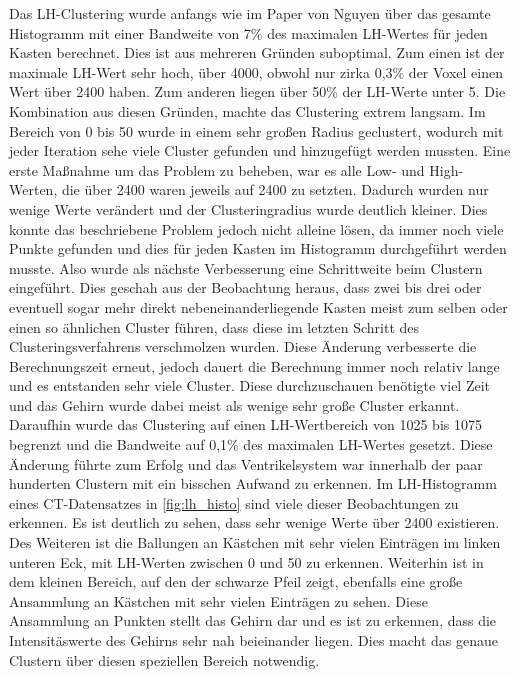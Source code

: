 Das LH-Clustering wurde anfangs wie im Paper von Nguyen \cite{nguyen2012clustering} über das gesamte Histogramm mit einer Bandweite von 7\% des maximalen LH-Wertes für jeden Kasten berechnet. Dies ist aus mehreren Gründen suboptimal.
Zum einen ist der maximale LH-Wert sehr hoch, über 4000, obwohl nur zirka 0,3\% der Voxel einen Wert über 2400 haben. Zum anderen liegen über 50\% der LH-Werte unter 5. Die Kombination aus diesen Gründen, machte das Clustering extrem langsam. Im Bereich von 0 bis 50  wurde in einem sehr großen Radius geclustert, wodurch mit jeder Iteration sehe viele Cluster gefunden und hinzugefügt werden mussten.
\newline
Eine erste Maßnahme um das Problem zu beheben, war es alle Low- und High- Werten, die über 2400 waren jeweils auf 2400 zu setzten. Dadurch wurden nur wenige Werte verändert und der Clusteringradius wurde deutlich kleiner. Dies konnte das beschriebene Problem jedoch nicht alleine lösen, da immer noch viele Punkte gefunden und dies für jeden Kasten im Histogramm durchgeführt werden musste.
Also wurde als nächste Verbesserung eine Schrittweite beim Clustern eingeführt. Dies geschah aus der Beobachtung heraus, dass zwei bis drei oder eventuell sogar mehr direkt nebeneinanderliegende Kasten meist zum selben oder einen so ähnlichen Cluster führen, dass diese im letzten Schritt des Clusteringsverfahrens verschmolzen wurden.
Diese Änderung verbesserte die Berechnungszeit erneut, jedoch  dauert die Berechnung immer noch relativ lange und es entstanden sehr viele Cluster. Diese durchzuschauen benötigte viel Zeit und das Gehirn wurde dabei meist als wenige sehr große Cluster erkannt.
Daraufhin wurde das Clustering auf einen LH-Wertbereich von 1025 bis 1075 begrenzt und die Bandweite auf 0,1\% des maximalen LH-Wertes gesetzt. Diese Änderung führte zum Erfolg und das Ventrikelsystem war innerhalb der paar hunderten Clustern mit ein bisschen Aufwand zu erkennen.
\newline
Im LH-Histogramm eines CT-Datensatzes in \autoref{fig:lh_histo} sind viele dieser Beobachtungen zu erkennen. Es ist deutlich zu sehen, dass sehr wenige Werte über 2400 existieren. Des Weiteren ist die Ballungen an Kästchen mit sehr vielen Einträgen im linken unteren Eck, mit LH-Werten zwischen  0 und 50 zu erkennen.
Weiterhin ist in dem kleinen Bereich, auf den der schwarze Pfeil zeigt, ebenfalls eine große Ansammlung an Kästchen mit sehr vielen Einträgen zu sehen. Diese Ansammlung an Punkten stellt das Gehirn dar und es ist zu erkennen, dass die Intensitäswerte des Gehirns sehr nah beieinander liegen.
Dies macht das genaue Clustern über diesen speziellen Bereich notwendig.

